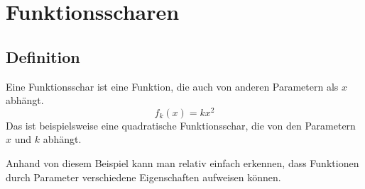 \chapter{Funktionsscharen}

\section{Definition}
\begin{flushleft}
  Eine Funktionsschar ist eine Funktion, die auch von anderen Parametern als \(x\) abhängt.
  \newline
  \[
    f_k(x)=kx^2
  \]
  \newline
  Das ist beispielsweise eine quadratische Funktionsschar, die von den Parametern \(x\) und \(k\) abhängt.
\end{flushleft}

\begin{center}
\end{center}

\begin{flushleft}
  Anhand von diesem Beispiel kann man relativ einfach erkennen, dass Funktionen durch Parameter verschiedene Eigenschaften aufweisen können.
\end{flushleft}
